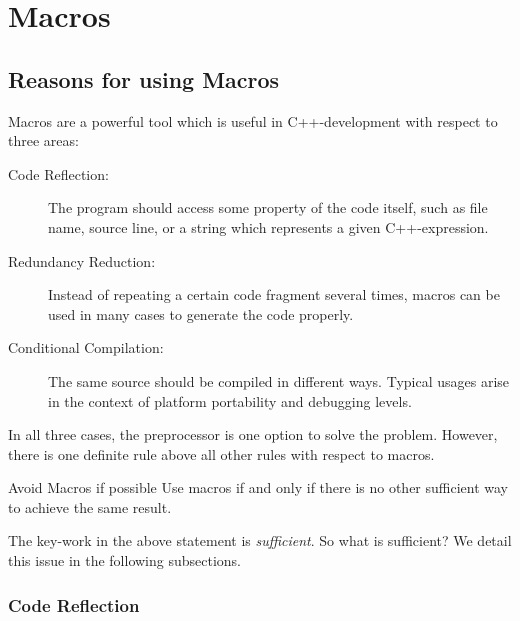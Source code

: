 %

\chapter{Macros}
\label{cha:macros}

\section{Reasons for using Macros}
\label{sec:reasons-using-macros}

Macros are a powerful tool which is useful in C++-development with
respect to three areas:
\begin{description}
\item[Code Reflection:] The program should access some property of the
  code itself, such as file name, source line, or a string which
  represents a given C++-expression.
\item[Redundancy Reduction:] Instead of repeating a certain code
  fragment several times, macros can be used in many cases to generate
  the code properly. 
\item[Conditional Compilation:] The same source should be compiled in
  different ways. Typical usages arise in the context of platform
  portability and debugging levels. 
\end{description}
%
In all three cases, the preprocessor is one option to solve the
problem. However, there is one definite rule above all other rules
with respect to macros.
%
\begin{rule*}{Avoid Macros if possible}
  Use macros if and only if there is no other sufficient way to
  achieve the same result.
\end{rule*}
%
The key-work in the above statement is \emph{sufficient}. So what is
sufficient? We detail this issue in the following subsections.


\subsection{Code Reflection}
\label{sec:code-reflection}

